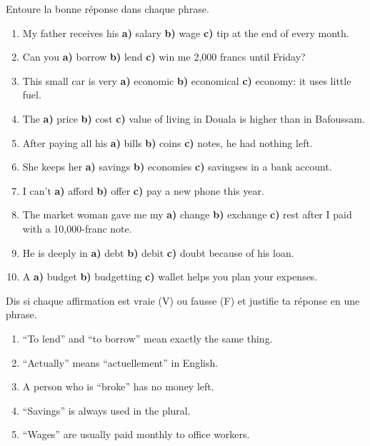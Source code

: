 \documentclass[11pt]{article}
\begin{document}
\begin{exercice}
Entoure la bonne réponse dans chaque phrase.
\begin{enumerate}
\item My father receives his \textbf{a)} salary \textbf{b)} wage \textbf{c)} tip at the end of every month.
\item Can you \textbf{a)} borrow \textbf{b)} lend \textbf{c)} win me 2,000 francs until Friday?
\item This small car is very \textbf{a)} economic \textbf{b)} economical \textbf{c)} economy: it uses little fuel.
\item The \textbf{a)} price \textbf{b)} cost \textbf{c)} value of living in Douala is higher than in Bafoussam.
\item After paying all his \textbf{a)} bills \textbf{b)} coins \textbf{c)} notes, he had nothing left.
\item She keeps her \textbf{a)} savings \textbf{b)} economies \textbf{c)} savingses in a bank account.
\item I can't \textbf{a)} afford \textbf{b)} offer \textbf{c)} pay a new phone this year.
\item The market woman gave me my \textbf{a)} change \textbf{b)} exchange \textbf{c)} rest after I paid with a 10,000-franc note.
\item He is deeply in \textbf{a)} debt \textbf{b)} debit \textbf{c)} doubt because of his loan.
\item A \textbf{a)} budget \textbf{b)} budgetting \textbf{c)} wallet helps you plan your expenses.
\end{enumerate}
\end{exercice}

\begin{exercice}
Dis si chaque affirmation est vraie (V) ou fausse (F) et justifie ta réponse en une phrase.
\begin{enumerate}
\item “To lend” and “to borrow” mean exactly the same thing.
\item “Actually” means “actuellement” in English.
\item A person who is “broke” has no money left.
\item “Savings” is always used in the plural.
\item “Wages” are usually paid monthly to office workers.
\end{enumerate}
\end{exercice}
\end{document}
